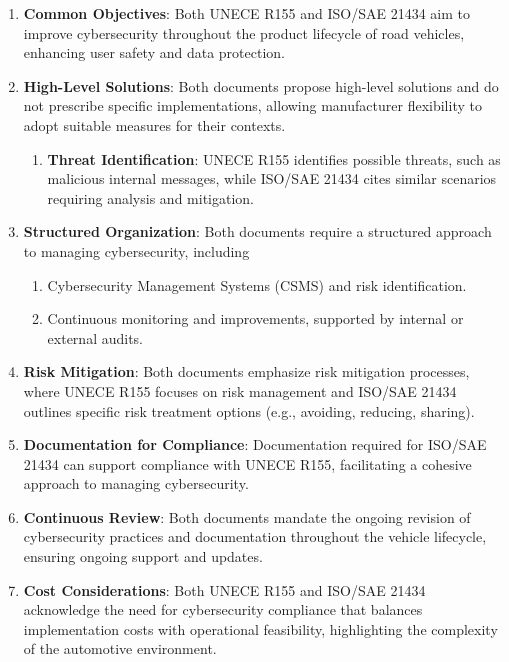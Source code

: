 \begin{enumerate}
    \item \textbf{Common Objectives}: Both UNECE R155 and ISO/SAE 21434 aim to improve cybersecurity throughout the product lifecycle of road vehicles, enhancing user safety and data protection.

    \item \textbf{High-Level Solutions}: Both documents propose high-level solutions and do not prescribe specific implementations, allowing manufacturer flexibility to adopt suitable measures for their contexts.
    \begin{enumerate}
        \item \textbf{Threat Identification}: UNECE R155 identifies possible threats, such as malicious internal messages, while ISO/SAE 21434 cites similar scenarios requiring analysis and mitigation.
    \end{enumerate}

    \item \textbf{Structured Organization}: Both documents require a structured approach to managing cybersecurity, including
    \begin{enumerate}
        \item Cybersecurity Management Systems (CSMS) and risk identification.
        \item Continuous monitoring and improvements, supported by internal or external audits.
    \end{enumerate}

    \item \textbf{Risk Mitigation}: Both documents emphasize risk mitigation processes, where UNECE R155 focuses on risk management and ISO/SAE 21434 outlines specific risk treatment options (e.g., avoiding, reducing, sharing).

    \item \textbf{Documentation for Compliance}: Documentation required for ISO/SAE 21434 can support compliance with UNECE R155, facilitating a cohesive approach to managing cybersecurity.

    \item \textbf{Continuous Review}: Both documents mandate the ongoing revision of cybersecurity practices and documentation throughout the vehicle lifecycle, ensuring ongoing support and updates.

    \item \textbf{Cost Considerations}: Both UNECE R155 and ISO/SAE 21434 acknowledge the need for cybersecurity compliance that balances implementation costs with operational feasibility, highlighting the complexity of the automotive environment.
\end{enumerate}

